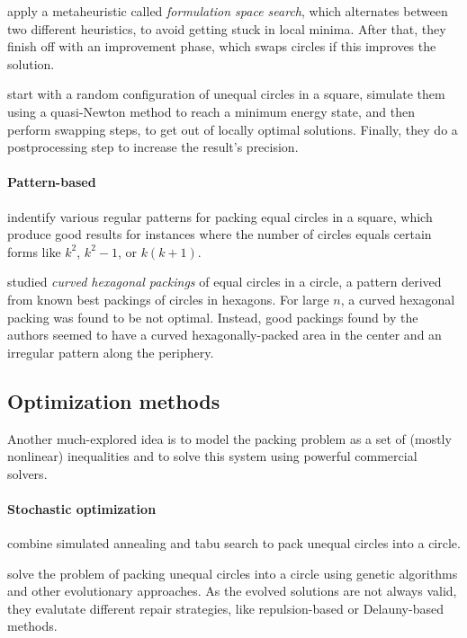 \documentclass[a4paper,style=print,oneside,bibliography=totoc,nexus,lnum,extramargin]{tubsbook}
\begin{document}
\textcite{LB2013packing} apply a metaheuristic called \emph{formulation space search}, which alternates between two different heuristics, to avoid getting stuck in local minima. After that, they finish off with an improvement phase, which swaps circles if this improves the solution.

\textcite{HHY2015action} start with a random configuration of unequal circles in a square, simulate them using a quasi-Newton method to reach a minimum energy state, and then perform swapping steps, to get out of locally optimal solutions. Finally, they do a postprocessing step to increase the result's precision.

\paragraph{Pattern-based}

\textcite{GL1996repeated} indentify various regular patterns for packing equal circles in a square, which produce good results for instances where the number of circles equals certain forms like $k^2$, $k^2-1$, or $k(k+1)$.

\textcite{lubachevsky1997curved} studied \emph{curved hexagonal packings} of equal circles in a circle, a pattern derived from known best packings of circles in hexagons. For large $n$, a curved hexagonal packing was found to be not optimal. Instead, good packings found by the authors seemed to have a curved hexagonally-packed area in the center and an irregular pattern along the periphery.

\subsection{Optimization methods}

Another much-explored idea is to model the packing problem as a set of (mostly nonlinear) inequalities and to solve this system using powerful commercial solvers.

\paragraph{Stochastic optimization}

\textcite{ZD2005effective} combine simulated annealing and tabu search to pack unequal circles into a circle.

\textcite{FMC2015evolutionary} solve the problem of packing unequal circles into a circle using genetic algorithms and other evolutionary approaches. As the evolved solutions are not always valid, they evalutate different repair strategies, like repulsion-based or Delauny-based methods.
\end{document}
